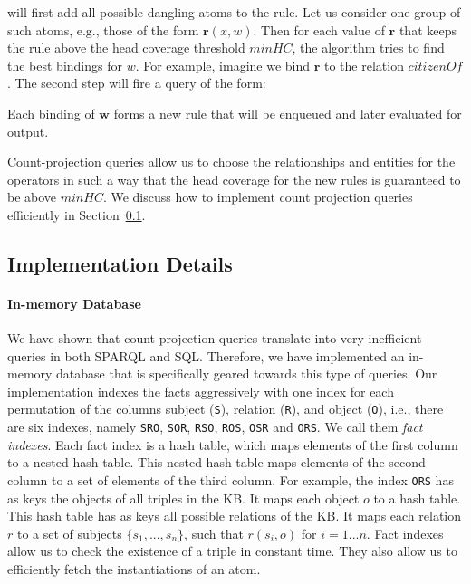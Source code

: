 \noindent will first add all possible dangling atoms to the rule. Let us consider one group of such atoms, e.g., those of the form
$\bm{r}(x,w)$. Then for each
value of $\bm{r}$ that keeps the rule above the head coverage threshold $minHC$, the algorithm tries to find the best bindings for 
$w$. For example, imagine we bind $\bm{r}$ to the relation $citizenOf$. The second step will fire a query of the form:


\noindent Each binding of $\bm{w}$ forms a new rule that will be enqueued and later evaluated for output.

Count-projection queries allow us to choose the relationships and entities for the operators 
in such a way that the head coverage for the new rules is guaranteed to be above $minHC$.
We discuss how to implement count projection queries efficiently in Section~\ref{subsec:implementation}.

\subsection{Implementation Details}
\label{subsec:implementation}

\paragraph{In-memory Database} We have shown \cite{amie} that count projection queries translate into very inefficient queries in both SPARQL and SQL. Therefore, we have implemented an in-memory database that is specifically geared towards this type of queries.
Our implementation indexes the facts aggressively with one index for each permutation of 
the columns subject (\texttt{S}), relation (\texttt{R}), and object (\texttt{O}), i.e., there are six indexes, namely \texttt{SRO}, \texttt{SOR}, \texttt{RSO}, \texttt{ROS}, \texttt{OSR} and \texttt{ORS}. We call them \emph{fact indexes}.
Each fact index is a hash table, which maps elements of the first column to a nested hash table. This nested hash table maps elements of the second column to a set of elements of the third column. For example, the index \texttt{ORS} has as keys the objects of all triples in the KB. It maps each object $o$ to a hash table. This hash table has as keys all possible relations of the KB. It maps each relation $r$ to a set of subjects $\{s_1,...,s_n\}$, such that $r(s_i, o)$ for $i=1...n$.
Fact indexes allow us to check the existence of a triple in constant time. They also allow us to efficiently fetch the instantiations of an atom.

